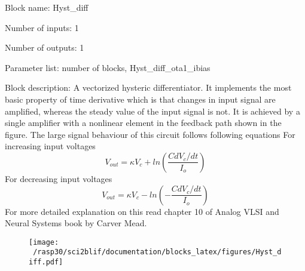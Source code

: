\pagebreak

Block name: Hyst\_diff

Number of inputs: 1

Number of outputs: 1

Parameter list: number of blocks, Hyst\_diff\_ota1\_ibias

Block description: 
A vectorized hysteric differentiator. It implements the most basic property of time derivative which is that changes in input signal are amplified, whereas the steady value of the input signal is not. 
It is achieved by a single amplifier with a nonlinear element in the feedback path shown in the figure. 
The large signal behaviour of this circuit follows following equations
For increasing input voltages
\begin{equation}
V_{out} = \kappa V_c + ln(\frac{C dV_c/dt}{I_o})
\end{equation}
For decreasing input voltages
\begin{equation}
V_{out} = \kappa V_c - ln(-\frac{C dV_c/dt}{I_o})
\end{equation}
For more detailed explanation on this read chapter 10 of Analog VLSI and Neural Systems book by Carver Mead.

\begin{figure}[H]  %
\texttt{[image: ~/rasp30/sci2blif/documentation/blocks\_latex/figures/Hyst\_diff.pdf]}
\end{figure}


